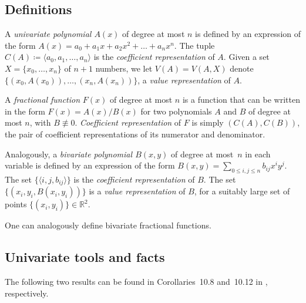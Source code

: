 \documentclass[11pt]{article}
\theoremstyle{remark}
\def\RR{\mathbb{R}}
\begin{document}
\subsection{Definitions}
 
A \emph{univariate polynomial $A(x)$} of degree at most $n$ is defined
by an expression of the form $A(x)=a_0+a_1x+a_2x^2+\dots+a_nx^n$.  The
tuple 
$C(A) \coloneqq \langle a_0,a_1,\dots,a_n\rangle$ 
is the \emph{coefficient representation} of $A$.
Given a set $X=\{x_0,\dots,x_n \}$ of $n+1$ numbers, 
we let $V(A)=V(A,X)$ denote
$\{(x_0,A(x_0)), \dots, (x_n,A(x_n))\}$, a \emph{value representation} of $A$.


A \emph{fractional function} $F(x)$ of degree at most $n$ is a
function that can be written in the form $F(x)=A(x)/B(x)$ for two
polynomials $A$ and $B$ of degree at most $n$, with $B\not\equiv 0$.
\emph{Coefficient representation} of $F$ is simply $(C(A),C(B))$, the
pair of coefficient representations of its numerator and denominator.

Analogously, a \emph{bivariate polynomial $B(x,y)$} of degree at most~$n$ in each variable is defined by an expression of the form
$B(x,y)=\sum_{0 \leq i, j \leq n} b_{ij} x^iy^j$.  The set $
\{\langle i,j,b_{ij} \rangle\}$ is the \emph{coefficient representation} of
$B$.
The set $\{ (x_i,y_i,B(x_i,y_i)) \}$ is a \emph{value representation} of $B$, for a suitably large set of points $\{ (x_i,y_i) \} \in \RR^2$. 


One can analogously define bivariate fractional functions.

\subsection{Univariate tools and facts}
\label{sec:uni-tools}

The following two results can be found in Corollaries~10.8 and~10.12 in \cite{gg-mca-99}, respectively.
\end{document}
